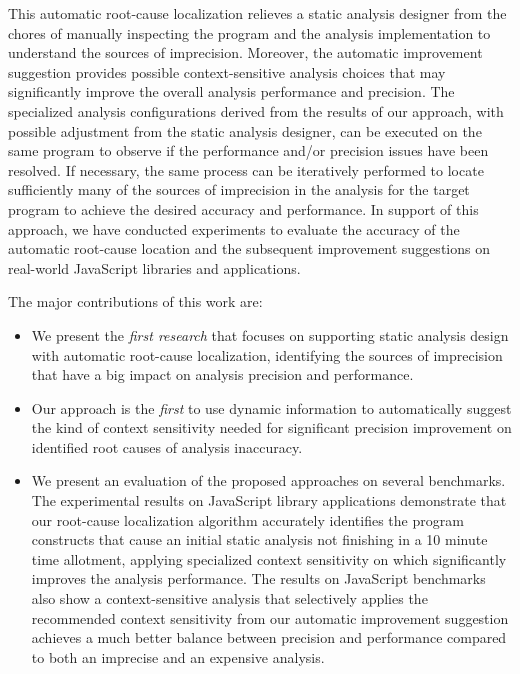 This automatic root-cause localization relieves a static
analysis designer from the chores of manually inspecting the program and
the analysis implementation to understand the sources of imprecision.
Moreover, the automatic improvement suggestion
provides possible context-sensitive analysis choices that may significantly improve
the overall analysis performance and precision. The specialized
analysis configurations derived from the results of our
approach, with possible adjustment from the static analysis
designer, can be executed on the same program to observe if
the performance and/or precision issues have been resolved.
If necessary, the same process can be iteratively performed
to locate sufficiently many of the sources of imprecision in the analysis 
for the target program to achieve the desired accuracy and performance.
In support of this approach, we have conducted experiments to evaluate
the accuracy of the automatic root-cause location and the subsequent
improvement suggestions on real-world JavaScript libraries and applications.

The major contributions of this work are:

\begin{itemize}
\item We present the {\it first research}  that focuses on supporting
static analysis design with automatic root-cause localization,
identifying the sources of imprecision that have a 
big impact on analysis precision and performance.

\item Our approach is the {\it first} to use 
dynamic information to automatically suggest the kind of context sensitivity
needed for significant precision improvement on identified root causes
of analysis inaccuracy.

\item We present an evaluation of the proposed approaches on several benchmarks. 
The experimental results on JavaScript library applications demonstrate that our root-cause localization algorithm accurately identifies the program constructs that cause an initial static analysis not finishing in a 10 minute time allotment, applying specialized context sensitivity on which significantly improves the analysis performance. The results on JavaScript benchmarks also show a context-sensitive analysis that selectively applies the recommended context sensitivity from our automatic improvement suggestion achieves a much better balance between precision and performance compared to both an imprecise and an expensive analysis.

\end{itemize}

